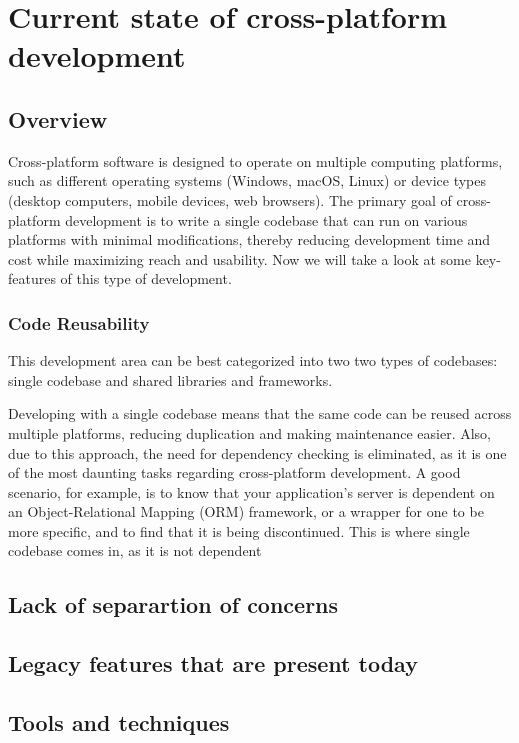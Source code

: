 \chapter{Current state of cross-platform development}
\section{Overview}
Cross-platform software is designed to operate on multiple computing platforms, such as different operating systems (Windows, macOS, Linux) or device types (desktop computers, mobile devices, web browsers).
The primary goal of cross-platform development is to write a single codebase that can run on various platforms with minimal modifications, thereby reducing development time and cost while maximizing reach and usability.
Now we will take a look at some key-features of this type of development.
\subsection{Code Reusability}
This development area can be best categorized into two two types of codebases: single codebase and shared libraries and frameworks.
\par
Developing with a single codebase means that the same code can be reused across multiple platforms, reducing duplication and making maintenance easier.
Also, due to this approach, the need for dependency checking is eliminated, as it is one of the most daunting tasks regarding cross-platform development.
A good scenario, for example, is to know that your application's server is dependent on an Object-Relational Mapping (ORM) framework, or a wrapper for one to be more specific, and to find that it is being discontinued.
This is where single codebase comes in, as it is not dependent  


\section{Lack of separartion of concerns}
\section{Legacy features that are present today}
\section{Tools and techniques}
\label{chap:ch4}


